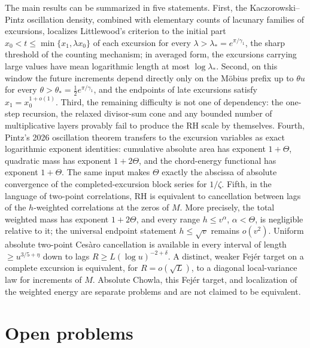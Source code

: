 \documentclass[11pt]{amsart}
\numberwithin{equation}{section}
\theoremstyle{plain}
\theoremstyle{definition}
\theoremstyle{remark}
\begin{document}
The main results can be summarized in five statements. First, the
Kaczorowski--Pintz oscillation density, combined with elementary counts of
lacunary families of excursions, localizes Littlewood's criterion to the
initial part $x_0<t\le\min\{x_1,\lambda x_0\}$ of each excursion for every
$\lambda>\lambda_*=e^{\pi/\gamma_1}$, the sharp threshold of the counting
mechanism; in averaged form, the excursions carrying large values have mean
logarithmic length at most $\log\lambda_*$. Second, on this window the
future increments depend directly only on the M\"obius prefix up to
$\theta u$ for every $\theta>\theta_*=\frac12e^{\pi/\gamma_1}$, and the
endpoints of late excursions satisfy $x_1=x_0^{1+o(1)}$. Third, the
remaining difficulty is not one of dependency: the one-step recursion, the
relaxed divisor-sum cone and any bounded number of multiplicative layers
provably fail to produce the RH scale by themselves. Fourth, Pintz's 2026
oscillation theorem transfers to the excursion variables as exact
logarithmic exponent identities: cumulative absolute area has exponent
$1+\Theta$, quadratic mass has exponent $1+2\Theta$, and the chord-energy
functional has exponent $1+\Theta$.  The same input makes $\Theta$ exactly
the abscissa of absolute convergence of the completed-excursion block
series for $1/\zeta$. Fifth, in the language of two-point correlations, RH
is equivalent to cancellation between lags of the $h$-weighted correlations
at the zeros of $M$.  More precisely, the total weighted mass has exponent
$1+2\Theta$, and every range $h\le v^\alpha$, $\alpha<\Theta$, is negligible
relative to it; the universal endpoint statement $h\le\sqrt v$ remains
$o(v^2)$. Uniform absolute two-point Ces\`aro cancellation is available in
every interval of length $\ge u^{3/5+\eta}$ down to lags
$R\ge L(\log u)^{-2+\delta}$. A distinct, weaker Fej\'er target on a complete
excursion is equivalent, for $R=o(\sqrt L)$, to a diagonal local-variance
law for increments of $M$. Absolute Chowla, this Fej\'er target, and
localization of the weighted energy are separate problems and are not
claimed to be equivalent.

\section{Open problems}
\label{sec:open_questions}
\end{document}
